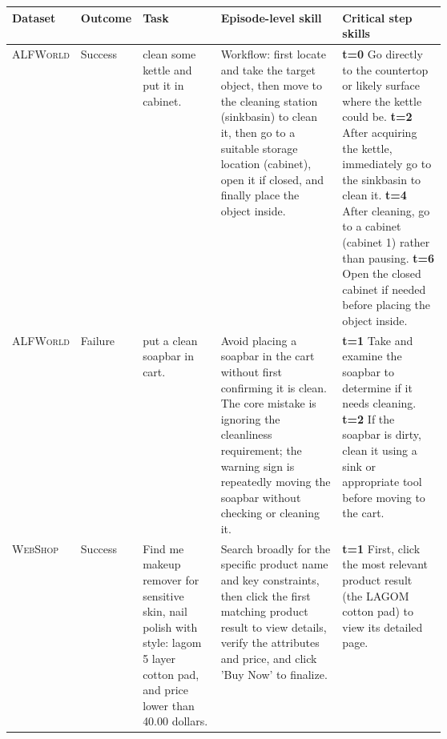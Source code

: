 \documentclass{llmxive}
\providecommand{\arraystretch}{1.08}
\begin{document}
\begin{table}[ht!]
\centering

\scriptsize
\setlength{\tabcolsep}{2.4pt}
\renewcommand{\arraystretch}{1.10}

\begin{tabularx}{\linewidth}{
  >{\arraybackslash}p{0.10\linewidth}
  >{\arraybackslash}p{0.07\linewidth}
  >{\arraybackslash}p{0.18\linewidth}
  >{\arraybackslash}p{0.28\linewidth}
  >{\arraybackslash}X
}
\toprule
\textbf{Dataset}
&
\textbf{Outcome}
&
\textbf{Task}
&
\textbf{Episode-level skill}
&
\textbf{Critical step skills}
\\
\midrule

\textsc{ALFWorld}
&
Success
&
clean some kettle and put it in cabinet.
&
Workflow: first locate and take the target object, then move to the cleaning
station (sinkbasin) to clean it, then go to a suitable storage location
(cabinet), open it if closed, and finally place the object inside.
&
\textbf{t=0} Go directly to the countertop or likely surface where the kettle
could be. \newline
\textbf{t=2} After acquiring the kettle, immediately go to the sinkbasin to
clean it. \newline
\textbf{t=4} After cleaning, go to a cabinet (cabinet 1) rather than pausing.
\newline
\textbf{t=6} Open the closed cabinet if needed before placing the object
inside.
\\

\addlinespace[0.30em]

\textsc{ALFWorld}
&
Failure
&
put a clean soapbar in cart.
&
Avoid placing a soapbar in the cart without first confirming it is clean.
The core mistake is ignoring the cleanliness requirement; the warning sign is
repeatedly moving the soapbar without checking or cleaning it.
&
\textbf{t=1} Take and examine the soapbar to determine if it needs cleaning.
\newline
\textbf{t=2} If the soapbar is dirty, clean it using a sink or appropriate
tool before moving to the cart.
\\

\midrule

\textsc{WebShop}
&
Success
&
Find me makeup remover for sensitive skin, nail polish with style: lagom
5 layer cotton pad, and price lower than 40.00 dollars.
&
Search broadly for the specific product name and key constraints, then click
the first matching product result to view details, verify the attributes and
price, and click 'Buy Now' to finalize.
&
\textbf{t=1} First, click the most relevant product result
(the LAGOM cotton pad) to view its detailed page.
\\


\end{tabularx}
\end{table}
\end{document}
